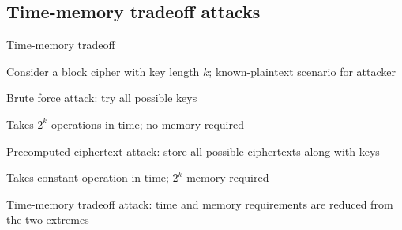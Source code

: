 \documentclass{beamer}
\begin{document}
\subsection{Time-memory tradeoff attacks}

\begin{frame}{Time-memory tradeoff}
\begin{itemize}
\footnotesize{	
	\item Consider a block cipher with key length $k$; known-plaintext scenario for attacker
	\item Brute force attack: try all possible keys
		\begin{itemize}
			\footnotesize{\item Takes $2^k$ operations in time; no memory required}
		\end{itemize}
	\item Precomputed ciphertext attack: store all possible ciphertexts along with keys
		\begin{itemize}
			\footnotesize{\item Takes constant operation in time; $2^k$ memory required}
		\end{itemize}
	\item Time-memory tradeoff attack: time and memory requirements are reduced from the two extremes
}\end{itemize}

\end{frame}
\end{document}
